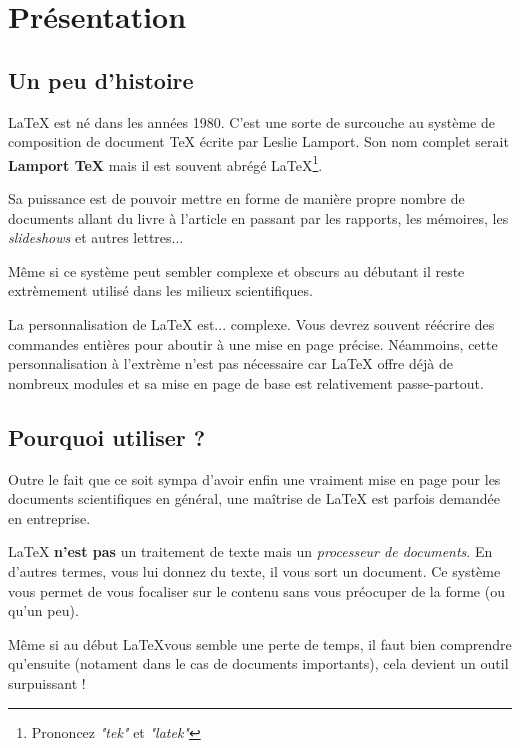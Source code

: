 \section{Présentation}

\subsection{Un peu d'histoire} %
    
    \LaTeX{} est né dans les années 1980.
    C'est une sorte de surcouche au système de composition de document \TeX{} écrite par Leslie Lamport.
    Son nom complet serait {\bfseries Lamport \TeX{}} mais il est souvent abrégé \LaTeX{}\footnote{Prononcez {\itshape "tek"} et {\itshape "latek"}}.
    
    Sa puissance est de pouvoir mettre en forme de manière propre nombre de documents allant du livre à l'article en passant par les rapports, les mémoires, les {\itshape slideshows} et autres lettres...

    Même si ce système peut sembler complexe et obscurs au débutant il reste extrèmement utilisé dans les milieux scientifiques.

    La personnalisation de \LaTeX{} est... complexe. Vous devrez souvent réécrire des commandes entières pour aboutir à une mise en page précise.
    Néammoins, cette personnalisation à l'extrème n'est pas nécessaire car \LaTeX{} offre déjà de nombreux modules et sa mise en page de base est relativement passe-partout.


\subsection{Pourquoi utiliser \protect{\LaTeX{}} ?} %

    Outre le fait que ce soit sympa d'avoir enfin une vraiment mise en page pour les documents scientifiques en général, une maîtrise de \LaTeX{} est parfois demandée en entreprise.

    \LaTeX{} {\bfseries n'est pas} un traitement de texte mais un {\itshape processeur de documents}.
    En d'autres termes, vous lui donnez du texte, il vous sort un document.
    Ce système vous permet de vous focaliser sur le contenu sans vous préocuper de la forme (ou qu'un peu).

    Même si au début \LaTeX vous semble une perte de temps, il faut bien comprendre qu'ensuite (notament dans le cas de documents importants), cela devient un outil surpuissant !

